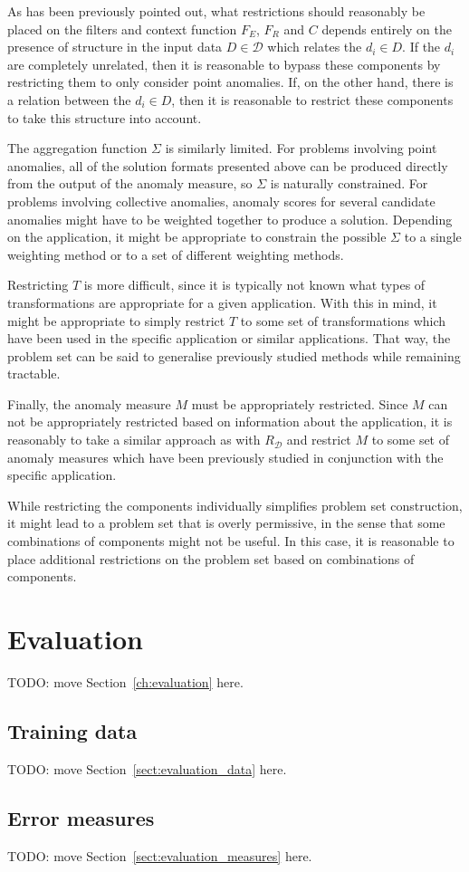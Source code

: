 As has been previously pointed out, what restrictions should reasonably be placed on the filters and context function $F_E$, $F_R$ and $C$ depends entirely on the presence of structure in the input data $D \in \mathcal{D}$ which relates the $d_i \in D$. If the $d_i$ are completely unrelated, then it is reasonable to bypass these components by restricting them to only consider point anomalies. If, on the other hand, there is a relation between the $d_i \in D$, then it is reasonable to restrict these components to take this structure into account.

The aggregation function $\Sigma$ is similarly limited. For problems involving point anomalies, all of the solution formats presented above can be produced directly from the output of the anomaly measure, so $\Sigma$ is naturally constrained. For problems involving collective anomalies, anomaly scores for several candidate anomalies might have to be weighted together to produce a solution. Depending on the application, it might be appropriate to constrain the possible $\Sigma$ to a single weighting method or to a set of different weighting methods.

Restricting $T$ is more difficult, since it is typically not known what types of transformations are appropriate for a given application. With this in mind, it might be appropriate to simply restrict $T$ to some set of transformations which have been used in the specific application or similar applications. That way, the problem set can be said to generalise previously studied methods while remaining tractable.

Finally, the anomaly measure $M$ must be appropriately restricted. Since $M$ can not be appropriately restricted based on information about the application, it is reasonably to take a similar approach as with $R_{\mathcal{D}}$ and restrict $M$ to some set of anomaly measures which have been previously studied in conjunction with the specific application.

While restricting the components individually simplifies problem set construction, it might lead to a problem set that is overly permissive, in the sense that some combinations of components might not be useful. In this case, it is reasonable to place additional restrictions on the problem set based on combinations of components.

\section{Evaluation}

TODO: move Section~\ref{ch:evaluation} here.

\subsection{Training data}

TODO: move Section~\ref{sect:evaluation_data} here.

\subsection{Error measures}

TODO: move Section~\ref{sect:evaluation_measures} here.
